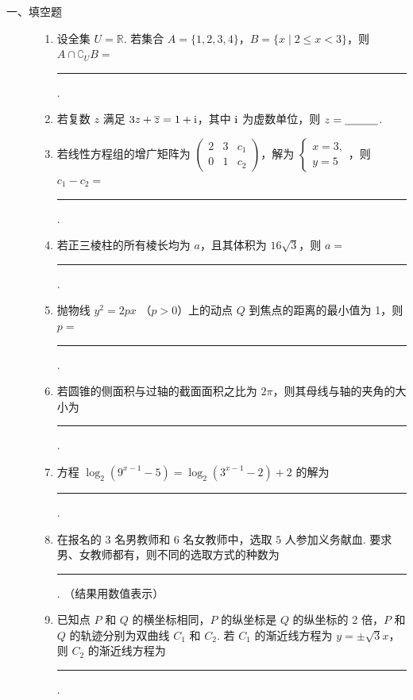 \begin{description}

    \item[一、填空题]

    \begin{enumerate}[leftmargin=5pt]

        \item 设全集 \(U = \mathbb{R}\). 若集合 \(A = \{1, 2, 3, 4\}\)，\(B = \{x \mid 2 \leqslant x < 3\}\)，则 \(A \cap \complement_U B = \)\rule[-0.3ex]{3em}{0.4pt}.

        \item 若复数 \(z\) 满足 \(3z + \overline{z} = 1 + \mathrm{i}\)，其中 \(\mathrm{i}\) 为虚数单位，则 \(z =\rule[-0.3ex]{3em}{0.4pt}\).

        \item 若线性方程组的增广矩阵为 \(\begin{pmatrix}2 & 3 & c_1\\ 0 & 1 & c_2 \end{pmatrix}\)，解为 \(\begin{cases}
x = 3,\\
y = 5
\end{cases}\)，则 \(c_{1} - c_{2} =\)\rule[-0.3ex]{3em}{0.4pt}.

        \item 若正三棱柱的所有棱长均为 \(a\)，且其体积为 \(16\sqrt{3}\)，则 \(a = \)\rule[-0.3ex]{3em}{0.4pt}.

        \item 抛物线 \( y^{2} = 2px  \) （\(p > 0\)）上的动点 \(Q\) 到焦点的距离的最小值为 1，则 \(p =\)\rule[-0.3ex]{3em}{0.4pt}.

        \item 若圆锥的侧面积与过轴的截面面积之比为 \(2\pi\)，则其母线与轴的夹角的大小为\rule[-0.3ex]{3em}{0.4pt}.

        \item 方程 \(\log_2(9^{x - 1} - 5) = \log_2(3^{x - 1} - 2) + 2\) 的解为\rule[-0.3ex]{3em}{0.4pt}.

        \item 在报名的 \(3\) 名男教师和 \(6\) 名女教师中，选取 \(5\) 人参加义务献血. 要求男、女教师都有，则不同的选取方式的种数为\rule[-0.3ex]{3em}{0.4pt}. （结果用数值表示）

        \item 已知点 \(P\) 和 \(Q\) 的横坐标相同，\(P\) 的纵坐标是 \(Q\) 的纵坐标的 2 倍，\(P\) 和 \(Q\) 的轨迹分别为双曲线 \(C_1\) 和 \(C_2\). 若 \(C_1\) 的渐近线方程为 \(y = \pm \sqrt{3} x\)，则 \(C_2\) 的渐近线方程为\rule[-0.3ex]{3em}{0.4pt}.


\end{enumerate}
\end{description}

